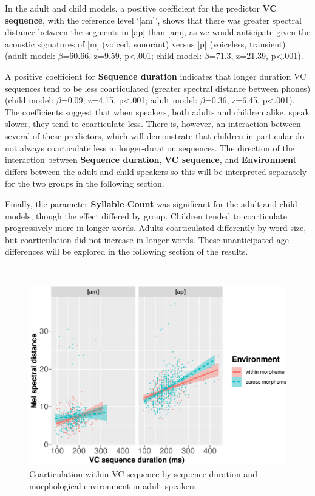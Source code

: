 \documentclass[
]{article}
\begin{document}
In the adult and child models, a positive coefficient for the predictor \textbf{VC sequence}, with the reference level `{[}am{]}', shows that there was greater spectral distance between the segments in {[}ap{]} than {[}am{]}, as we would anticipate given the acoustic signatures of {[}m{]} (voiced, sonorant) versus {[}p{]} (voiceless, transient) (adult model: \(\beta\)=60.66, z=9.59, p\textless.001; child model: \(\beta\)=71.3, z=21.39, p\textless.001).

A positive coefficient for \textbf{Sequence duration} indicates that longer duration VC sequences tend to be less coarticulated (greater spectral distance between phones) (child model: \(\beta\)=0.09, z=4.15, p\textless.001; adult model: \(\beta\)=0.36, z=6.45, p\textless.001). The coefficients suggest that when speakers, both adults and children alike, speak slower, they tend to coarticulate less. There is, however, an interaction between several of these predictors, which will demonstrate that children in particular do not always coarticulate less in longer-duration sequences. The direction of the interaction between \textbf{Sequence duration}, \textbf{VC sequence}, and \textbf{Environment} differs between the adult and child speakers so this will be interpreted separately for the two groups in the following section.

Finally, the parameter \textbf{Syllable Count} was significant for the adult and child models, though the effect differed by group. Children tended to coarticulate progressively more in longer words. Adults coarticulated differently by word size, but coarticulation did not increase in longer words. These unanticipated age differences will be explored in the following section of the results.

~
~

\begin{figure}
\centering
\includegraphics{3_ch3_results_files/figure-latex/adult-int-plot-1.pdf}
\caption{\label{fig:adult-int-plot}Coarticulation within VC sequence by sequence duration and morphological environment in adult speakers}
\end{figure}
\end{document}
